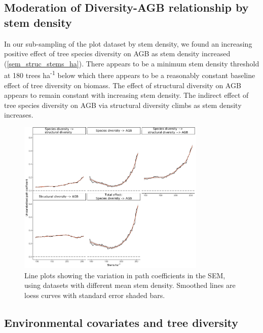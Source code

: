 \documentclass[11pt,a4paper]{article}
\newcommand{\textapprox}{\raisebox{0.5ex}{\texttildelow}}  %
\begin{document}


\subsection{Moderation of Diversity-AGB relationship by stem density}

In our sub-sampling of the plot dataset by stem density, we found an increasing positive effect of tree species diversity on AGB as stem density increased (\autoref{sem_struc_stems_ha}). There appears to be a minimum stem density threshold at \textapprox{}180 trees ha\textsuperscript{-1} below which there appears to be a reasonably constant baseline effect of tree diversity on biomass. The effect of structural diversity on AGB appears to remain constant with increasing stem density. The indirect effect of tree species diversity on AGB via structural diversity climbs as stem density increases. 

\begin{figure}[H]
\centering
	\includegraphics[width=0.8\textwidth]{sem_struc_stems_ha}
	\caption{Line plots showing the variation in path coefficients in the SEM, using datasets with different mean stem density. Smoothed lines are loess curves with standard error shaded bars.}
	\label{sem_struc_stems_ha}
\end{figure}

\subsection{Environmental covariates and tree diversity}
\end{document}
